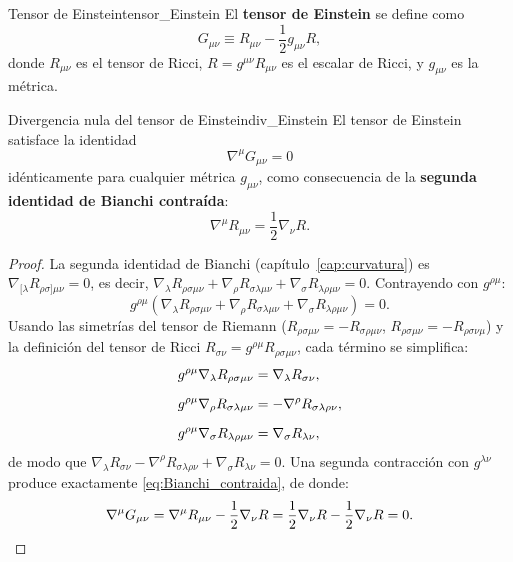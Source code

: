 \begin{definicion}{Tensor de Einstein}{tensor_Einstein}
El \textbf{tensor de Einstein} se define como
\begin{equation}
  G_{\mu\nu} \equiv R_{\mu\nu} - \frac{1}{2}g_{\mu\nu}R,
  \label{eq:tensor_Einstein}
\end{equation}
donde $R_{\mu\nu}$ es el tensor de Ricci, $R = g^{\mu\nu}R_{\mu\nu}$ es el escalar de Ricci, y $g_{\mu\nu}$ es la métrica.
\end{definicion}

\begin{teorema}{Divergencia nula del tensor de Einstein}{div_Einstein}
El tensor de Einstein satisface la identidad
\begin{equation}
  \nabla^\mu G_{\mu\nu} = 0
  \label{eq:div_Einstein}
\end{equation}
idénticamente para cualquier métrica $g_{\mu\nu}$, como consecuencia de la \textbf{segunda identidad de Bianchi contraída}:
\begin{equation}
  \nabla^\mu R_{\mu\nu} = \frac{1}{2}\nabla_\nu R.
  \label{eq:Bianchi_contraida}
\end{equation}
\end{teorema}

\begin{proof}
La segunda identidad de Bianchi (capítulo~\ref{cap:curvatura}) es
$\nabla_{[\lambda}R_{\rho\sigma]\mu\nu} = 0$, es decir,
$\nabla_\lambda R_{\rho\sigma\mu\nu} + \nabla_\rho R_{\sigma\lambda\mu\nu} + \nabla_\sigma R_{\lambda\rho\mu\nu} = 0$.
Contrayendo con $g^{\rho\mu}$:
\begin{equation}
  g^{\rho\mu}(\nabla_\lambda R_{\rho\sigma\mu\nu} + \nabla_\rho R_{\sigma\lambda\mu\nu} + \nabla_\sigma R_{\lambda\rho\mu\nu}) = 0.
\end{equation}
Usando las simetrías del tensor de Riemann ($R_{\rho\sigma\mu\nu} = -R_{\sigma\rho\mu\nu}$, $R_{\rho\sigma\mu\nu} = -R_{\rho\sigma\nu\mu}$) y la definición del tensor de Ricci $R_{\sigma\nu} = g^{\rho\mu}R_{\rho\sigma\mu\nu}$, cada término se simplifica:
\begin{align}
  g^{\rho\mu}\nabla_\lambda R_{\rho\sigma\mu\nu} &= \nabla_\lambda R_{\sigma\nu}, \nl
  g^{\rho\mu}\nabla_\rho R_{\sigma\lambda\mu\nu} &= -\nabla^\rho R_{\sigma\lambda\rho\nu}, \nl
  g^{\rho\mu}\nabla_\sigma R_{\lambda\rho\mu\nu} &= \nabla_\sigma R_{\lambda\nu},
\end{align}
de modo que $\nabla_\lambda R_{\sigma\nu} - \nabla^\rho R_{\sigma\lambda\rho\nu} + \nabla_\sigma R_{\lambda\nu} = 0$.
Una segunda contracción con $g^{\lambda\nu}$ produce exactamente \eqref{eq:Bianchi_contraida}, de donde:
\begin{equation}
  \nabla^\mu G_{\mu\nu} = \nabla^\mu R_{\mu\nu} - \frac{1}{2}\nabla_\nu R = \frac{1}{2}\nabla_\nu R - \frac{1}{2}\nabla_\nu R = 0. \qedhere
\end{equation}
\end{proof}

